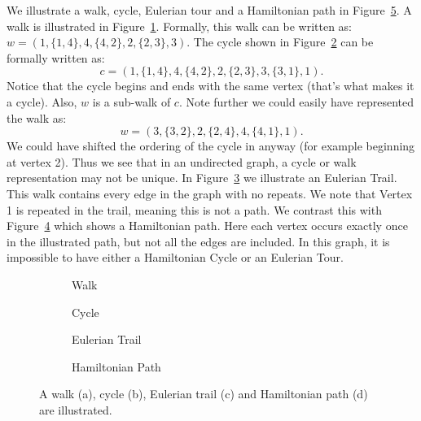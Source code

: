 \begin{example}
We illustrate a walk, cycle, Eulerian tour and a Hamiltonian path in Figure~\ref{fig:g7}.
A walk is illustrated in Figure~\ref{fig:g7a}.
Formally, this walk can be written as:
\(w = (1, \{1, 4\},\allowbreak 4, \{4, 2\},\allowbreak 2, \{2, 3\},\allowbreak 3)\).
The cycle shown in Figure~\ref{fig:g7b} can be formally written as:
\[c = (1, \{1, 4\},\allowbreak 4,\{ 4, 2\},\allowbreak 2, \{2, 3\},\allowbreak 3,\{ 3, 1\},\allowbreak 1).\]
Notice that the cycle begins and ends with the same vertex (that's what makes it a cycle).
Also, \(w\) is a sub-walk of \(c\). Note further we could easily have represented the walk as:
\[w = (3, \{3, 2\},\allowbreak 2,\{ 2, 4\},\allowbreak 4,\{4,1\},\allowbreak 1).\]
We could have shifted the ordering of the cycle in anyway (for example beginning at vertex 2).
Thus we see that in an undirected graph, a cycle or walk representation may not be unique.
In Figure~\ref{fig:g7c} we illustrate an Eulerian Trail.
This walk contains every edge in the graph with no repeats.
We note that Vertex 1 is repeated in the trail, meaning this is not a path.
We contrast this with Figure~\ref{fig:g7d} which shows a Hamiltonian path.
Here each vertex occurs exactly once in the illustrated path, but not all the edges are included.
In this graph, it is impossible to have either a Hamiltonian Cycle or an Eulerian Tour.
\end{example}
%
\begin{figure}
\centering
\begin{subfigure}{0.24\textwidth}
  \centering
  
  \caption{\label{fig:g7a}Walk}
\end{subfigure}
\begin{subfigure}{0.24\textwidth}
  \centering
  
  \caption{\label{fig:g7b}Cycle}
\end{subfigure}
\begin{subfigure}{0.24\textwidth}
  \centering
  
  \caption{\label{fig:g7c}Eulerian Trail}
\end{subfigure}
\begin{subfigure}{0.24\textwidth}
  \centering
  
  \caption{\label{fig:g7d}Hamiltonian Path}
\end{subfigure}
\caption{\label{fig:g7}%
A walk (a), cycle (b), Eulerian trail (c) and Hamiltonian path (d) are illustrated.
}
\end{figure}



